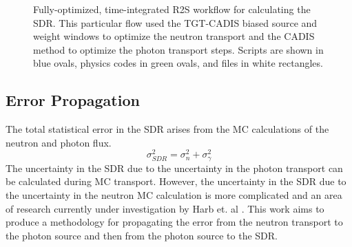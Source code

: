 \begin{figure}

	\caption[Fully optimized, time-integrated R2S workflow]
	{Fully-optimized, time-integrated R2S workflow for calculating the SDR.  
	This particular flow used the TGT-CADIS biased source and weight windows to
	optimize the neutron transport and the CADIS method to optimize the 
	photon transport steps.
	Scripts are shown in
	blue ovals, physics codes in green ovals, and files in white
	rectangles.\label{fig:otr2s_flow}}
\end{figure}


\subsection{Error Propagation}\label{sec:error}
The total statistical error in the SDR
arises from the MC calculations of the neutron and photon flux.
\begin{equation}\label{eq:toterr}
	\sigma_{SDR}^{2} = \sigma_n^2 + \sigma_{\gamma}^2
\end{equation}
The uncertainty in the SDR due to the uncertainty in the photon transport can
be calculated during MC transport. However, the 
uncertainty in the SDR due to the uncertainty in the neutron MC
calculation is more complicated and an area of research currently under investigation by Harb et.
al \cite{harb}.  This work aims to produce a methodology for propagating the error from the
neutron transport to the photon source and then from the photon source to the
SDR.

